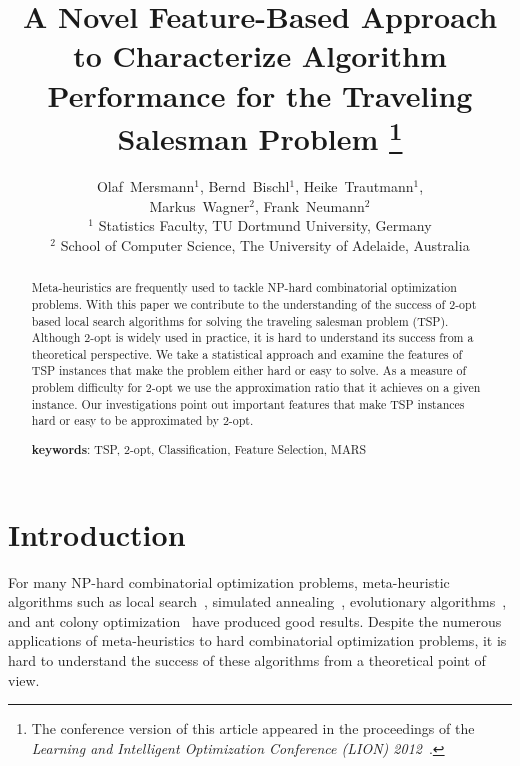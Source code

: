 \documentclass{article}
\begin{document}
	
\title{A Novel Feature-Based Approach to Characterize Algorithm
  Performance for the Traveling Salesman Problem
  \thanks{The conference version of this article appeared in the
    proceedings of the \emph{Learning and Intelligent Optimization
      Conference (LION) 2012}~\cite{mersmann2012}.}  }

\author{Olaf~Mersmann$^1$, Bernd~Bischl$^1$, Heike~Trautmann$^1$, \\
Markus~Wagner$^2$, Frank~Neumann$^2$\\
 $^1$ Statistics Faculty, TU Dortmund University, Germany \\
 $^2$ School of Computer Science, The University of Adelaide, Australia\\
  }

\maketitle

\begin{abstract}
  Meta-heuristics are frequently used to tackle NP-hard combinatorial
  optimization problems.  With this paper we contribute to the
  understanding of the success of $2$-opt based local search
  algorithms for solving the traveling salesman problem
  (TSP). Although $2$-opt is widely used in practice, it is hard to
  understand its success from a theoretical perspective. We take a
  statistical approach and examine the features of TSP instances that
  make the problem either hard or easy to solve. As a measure of
  problem difficulty for $2$-opt we use the approximation ratio that
  it achieves on a given instance. Our investigations point out
  important features that make TSP instances hard or easy to be
  approximated by $2$-opt.

  \textbf{keywords}: TSP, $2$-opt, Classification, Feature Selection, MARS
\end{abstract}



\section{Introduction}

For many NP-hard combinatorial optimization problems, meta-heuristic
algorithms such as local search~\cite{HoosS2004}, simulated
annealing~\cite{LaarAar97}, evolutionary algorithms~\cite{EibSmi2007},
and ant colony optimization~\cite{DorigoStuetzleACOBook} have produced
good results. Despite the numerous applications of meta-heuristics to
hard combinatorial optimization problems, it is hard to understand the
success of these algorithms from a theoretical point of view.
\end{document}
